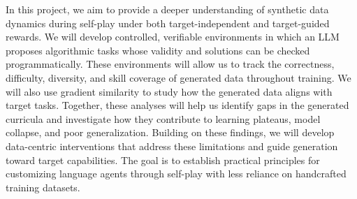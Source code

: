 In this project, we aim to provide a deeper understanding of synthetic data dynamics during self-play under both target-independent and target-guided rewards.
We will develop controlled, verifiable environments in which an LLM proposes algorithmic tasks whose validity and solutions can be checked programmatically.
These environments will allow us to track the correctness, difficulty, diversity, and skill coverage of generated data throughout training.
We will also use gradient similarity to study how the generated data aligns with target tasks.
Together, these analyses will help us identify gaps in the generated curricula and investigate how they contribute to learning plateaus, model collapse, and poor generalization.
Building on these findings, we will develop data-centric interventions that address these limitations and guide generation toward target capabilities.
The goal is to establish practical principles for customizing language agents through self-play with less reliance on handcrafted training datasets.




